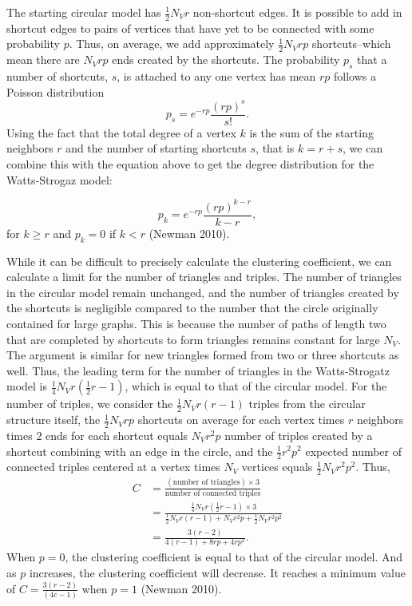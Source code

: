 \documentclass[12pt,twoside]{amherstthesis}
\begin{document}
  The starting circular model has \(\frac {1} {2} N_{V}r\) non-shortcut
  edges. It is possible to add in shortcut edges to pairs of vertices that
  have yet to be connected with some probability \(p\). Thus, on average,
  we add approximately \(\frac {1} {2} N_{V}rp\) shortcuts--which mean
  there are \(N_{V}rp\) ends created by the shortcuts. The probability
  \(p_{s}\) that a number of shortcuts, \(s\), is attached to any one
  vertex has mean \(rp\) follows a Poisson distribution
  \[p_{s} = e^{-rp} \frac {(rp)^{s}} {s!}.\] Using the fact that the total
  degree of a vertex \(k\) is the sum of the starting neighbors \(r\) and
  the number of starting shortcuts \(s\), that is \(k = r + s\), we can
  combine this with the equation above to get the degree distribution for
  the Watts-Strogaz model:
  
  \[p_{k} = e^{-rp}\frac {(rp)^{k - r}} {k - r},\] for \(k \geq r\) and
  \(p_{k} = 0\) if \(k < r\) (Newman 2010).
  
  While it can be difficult to precisely calculate the clustering
  coefficient, we can calculate a limit for the number of triangles and
  triples. The number of triangles in the circular model remain unchanged,
  and the number of triangles created by the shortcuts is negligible
  compared to the number that the circle originally contained for large
  graphs. This is because the number of paths of length two that are
  completed by shortcuts to form triangles remains constant for large
  \(N_{V}\). The argument is similar for new triangles formed from two or
  three shortcuts as well. Thus, the leading term for the number of
  triangles in the Watts-Strogatz model is
  \(\frac {1} {4} N_{V}r \left(\frac {1} {2} r - 1 \right)\), which is
  equal to that of the circular model. For the number of triples, we
  consider the \(\frac {1} {2} N_{V} r(r - 1)\) triples from the circular
  structure itself, the \(\frac {1} {2}N_{V}rp\) shortcuts on average for
  each vertex times \(r\) neighbors times \(2\) ends for each shortcut
  equals \(N_{V}r^{2}p\) number of triples created by a shortcut combining
  with an edge in the circle, and the \(\frac {1} {2} r^{2} p^2\) expected
  number of connected triples centered at a vertex times \(N_{V}\)
  vertices equals \(\frac {1} {2} N_{V} r^{2} p^2\). Thus, \[
  \begin{aligned}
  C &= \frac {(\text{number of triangles}) \times 3} {\text{number of connected triples}}  \\
  &= \frac {\frac {1} {4} N_{V} r \left(\frac {1} {2} r - 1 \right) \times 3} {\frac {1} {2} N_{V} r(r - 1) + N_{V}r^{2}p + \frac {1} {2} N_{V} r^{2} p^2} \\
  &= \frac{3(r - 2)} {4(r - 1)+8rp + 4rp^{2}}.
  \end{aligned}
  \] When \(p = 0\), the clustering coefficient is equal to that of the
  circular model. And as \(p\) increases, the clustering coefficient will
  decrease. It reaches a minimum value of
  \(C = \frac {3(r - 2)} {(4c - 1)}\) when \(p = 1\) (Newman 2010).
  
\end{document}
